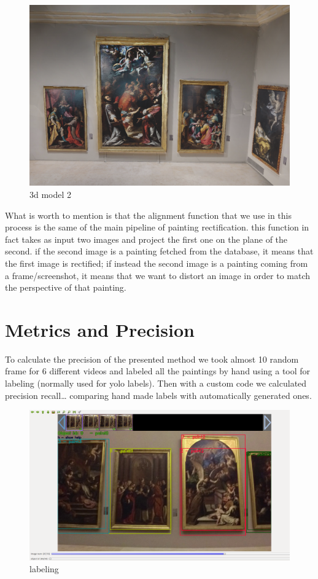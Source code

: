 \documentclass[conference]{IEEEtran}
\begin{document}
\begin{figure}[htbp]
\centerline{\includegraphics[width=0.8\columnwidth]{../screenshots_3d_model/screenshot_03.png}}
\caption{3d model 2}
\label{fig_3d_model_2}
\end{figure}

What is worth to mention is that the alignment function that we use in this process is the same of the main pipeline of painting rectification. this function in fact takes as input two images and project the first one on the plane of the second. if the second image is a painting fetched from the database, it means that the first image is rectified; if instead the second image is a painting coming from a frame/screenshot, it means that we want to distort an image in order to match the perspective of that painting.



\section{Metrics and Precision}
To calculate the precision of the presented method we took almost 10 random frame for 6 different videos and labeled all the paintings by hand using a tool for labeling (normally used for yolo labels). Then with a custom code we calculated precision recall… comparing hand made labels with automatically generated ones.

\begin{figure}[htbp]
\centerline{\includegraphics[width=0.8\columnwidth]{../Labeling_precision_metrics/Precision_Labeling.png}}
\caption{labeling}
\label{fig_labeling}
\end{figure}
\bigskip
\end{document}
